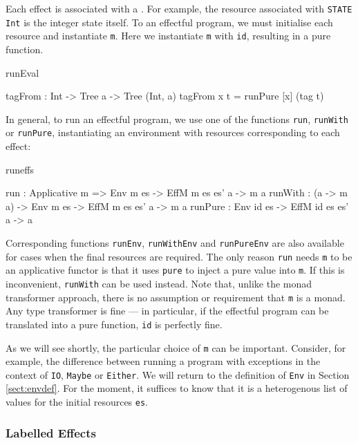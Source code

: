 \noindent
Each effect is associated with a . For example, the resource
associated with \texttt{STATE Int} is the integer state itself.  To 
an effectful program, we must initialise each resource and instantiate
\texttt{m}. Here we instantiate \texttt{m} with \texttt{id}, resulting in a
pure function.

\begin{SaveVerbatim}{runEval}

tagFrom : Int -> Tree a -> Tree (Int, a)
tagFrom x t = runPure [x] (tag t)

\end{SaveVerbatim}

\noindent
In general, to run an effectful program, we use one of the functions
\texttt{run}, \texttt{runWith} or \texttt{runPure}, instantiating an
environment with resources corresponding to each effect:

\begin{SaveVerbatim}{runeffs}

run     : Applicative m => 
          Env m es -> EffM m es es' a -> m a
runWith : (a -> m a) -> 
          Env m es -> EffM m es es' a -> m a
runPure : Env id es -> EffM id es es' a -> a

\end{SaveVerbatim}

\noindent
Corresponding functions \texttt{runEnv}, \texttt{runWithEnv} and
\texttt{runPureEnv} are also available for cases when the final resources are
required.  The only reason \texttt{run} needs \texttt{m} to be an applicative
functor
is that it uses \texttt{pure} to inject a pure value into \texttt{m}. If this
is inconvenient, \texttt{runWith} can be used instead. Note that, unlike the
monad transformer approach, there is no assumption or requirement that
\texttt{m} is a monad. Any type transformer is fine --- in particular,
if the effectful program can be translated into a pure function, \texttt{id}
is perfectly fine.

As we will see shortly, the particular choice of \texttt{m} can be
important. Consider, for example, the difference between running a program with
exceptions in the context of \texttt{IO}, \texttt{Maybe} or \texttt{Either}.
%
We will return to the definition of \texttt{Env} in Section \ref{sect:envdef}.
For the moment, it suffices to know that it is a heterogenous list of values
for the initial resources \texttt{es}.

\subsubsection{Labelled Effects}


